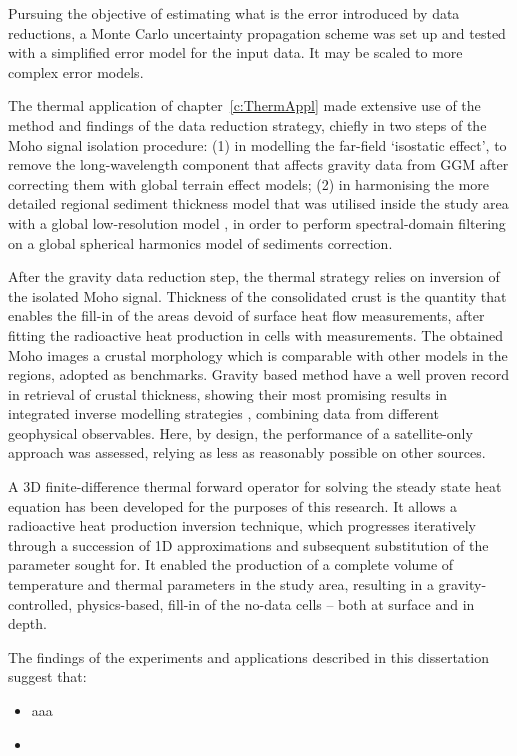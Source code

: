 Pursuing the objective of estimating what is the error introduced by data reductions, a Monte Carlo uncertainty propagation scheme was set up and tested with a simplified error model for the input data.
It may be scaled to more complex error models.

The thermal application of chapter~\ref{c:ThermAppl} made extensive use of the method and findings of the data reduction strategy, chiefly in two steps of the Moho signal isolation procedure:
(1) in modelling the far-field `isostatic effect', to remove the long-wavelength component that affects gravity data from GGM after correcting them with global terrain effect models; (2) in harmonising the more detailed regional sediment thickness model that was utilised inside the study area \parencite[{EuCRUST},][]{Tesauro2008} with a global low-resolution model \parencite[{LITHO1.0},][]{Pasyanos2014}, in order to perform spectral-domain filtering on a global spherical harmonics model of sediments correction.

After the gravity data reduction step, the thermal strategy relies on inversion of the isolated Moho signal.
Thickness of the consolidated crust is the quantity that enables the fill-in of the areas devoid of surface heat flow measurements, after fitting the radioactive heat production in cells with measurements.
The obtained Moho images a crustal morphology which is comparable with other models in the regions, adopted as benchmarks.
Gravity based method have a well proven record in retrieval of crustal thickness, showing their most promising results in integrated inverse modelling strategies \parencites[e.g.][]{Eshagh2011}{Reguzzoni2015}, combining data from different geophysical observables.
Here, by design, the performance of a satellite-only approach was assessed, relying as less as reasonably possible on other sources.

A 3D finite-difference thermal forward operator for solving the steady state heat equation has been developed for the purposes of this research.
It allows a radioactive heat production inversion technique, which progresses iteratively through a succession of 1D approximations and subsequent substitution of the parameter sought for.
It enabled the production of a complete volume of temperature and thermal parameters in the study area, resulting in a gravity-controlled, physics-based, fill-in of the no-data cells -- both at surface and in depth.

The findings of the experiments and applications described in this dissertation suggest that:
\begin{itemize}
    \item aaa %
    \item %
\end{itemize}

